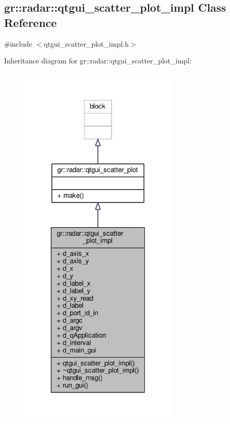 \subsection{gr\+:\+:radar\+:\+:qtgui\+\_\+scatter\+\_\+plot\+\_\+impl Class Reference}
\label{classgr_1_1radar_1_1qtgui__scatter__plot__impl}


{\ttfamily \#include $<$qtgui\+\_\+scatter\+\_\+plot\+\_\+impl.\+h$>$}



Inheritance diagram for gr\+:\+:radar\+:\+:qtgui\+\_\+scatter\+\_\+plot\+\_\+impl\+:
\nopagebreak
\begin{figure}[H]
\begin{center}
\leavevmode
\includegraphics[width=218pt]{dc/d31/classgr_1_1radar_1_1qtgui__scatter__plot__impl__inherit__graph}
\end{center}
\end{figure}


